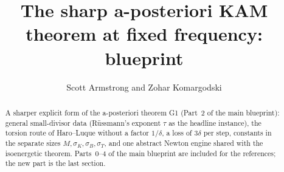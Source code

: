 \documentclass[11pt]{amsart}
\title{The sharp a-posteriori KAM theorem at fixed frequency: blueprint}
\author{Scott Armstrong and Zohar Komargodski}
\begin{document}
\begin{abstract}
A sharper explicit form of the a-posteriori theorem G1 (Part~2 of the main blueprint): general small-divisor data
(R\"ussmann's exponent $\tau$ as the headline instance), the torsion route of Haro--Luque without a factor $1/\delta$, a
loss of $3\delta$ per step, constants in the separate sizes $M,\sigma_K,\sigma_B,\sigma_T$, and one abstract Newton engine
shared with the isoenergetic theorem. Parts~0--4 of the main blueprint are included for the references; the new part is
the last section.
\end{abstract}
\maketitle
\tableofcontents






\end{document}
